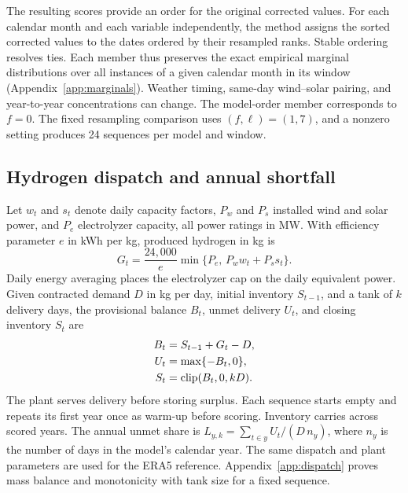 The resulting scores provide an order for the original corrected values. For each calendar month and each variable independently, the method assigns the sorted corrected values to the dates ordered by their resampled ranks. Stable ordering resolves ties. Each member thus preserves the exact empirical marginal distributions over all instances of a given calendar month in its window (Appendix~\ref{app:marginals}). Weather timing, same-day wind--solar pairing, and year-to-year concentrations can change. The model-order member corresponds to $f=0$. The fixed resampling comparison uses $(f,\ell)=(1,7)$, and a nonzero setting produces 24 sequences per model and window.

\subsection{Hydrogen dispatch and annual shortfall}
Let $w_t$ and $s_t$ denote daily capacity factors, $P_w$ and $P_s$ installed wind and solar power, and $P_e$ electrolyzer capacity, all power ratings in MW. With efficiency parameter $e$ in kWh per kg, produced hydrogen in kg is
\begin{equation}
\label{eq:production}
G_t = \frac{24{,}000}{e}\min\{P_e,\,P_ww_t+P_ss_t\}.
\end{equation}
Daily energy averaging places the electrolyzer cap on the daily equivalent power. Given contracted demand $D$ in kg per day, initial inventory $S_{t-1}$, and a tank of $k$ delivery days, the provisional balance $B_t$, unmet delivery $U_t$, and closing inventory $S_t$ are
\begin{equation}
\label{eq:dispatch}
\begin{aligned}
B_t &= S_{t-1}+G_t-D,\\
U_t &= \max\{-B_t,0\},\\
S_t &= \operatorname{clip}(B_t,0,kD).
\end{aligned}
\end{equation}
The plant serves delivery before storing surplus. Each sequence starts empty and repeats its first year once as warm-up before scoring. Inventory carries across scored years. The annual unmet share is $L_{y,k}=\sum_{t\in y}U_t/(D\,n_y)$, where $n_y$ is the number of days in the model's calendar year. The same dispatch and plant parameters are used for the ERA5 reference. Appendix~\ref{app:dispatch} proves mass balance and monotonicity with tank size for a fixed sequence.

